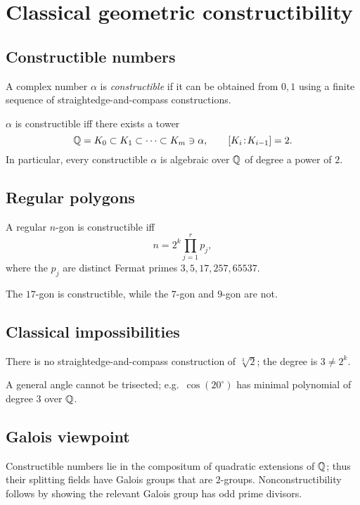 \section{Classical geometric constructibility}\label{sec:constructibility}

\subsection{Constructible numbers}
\begin{definition}
A complex number $\alpha$ is \emph{constructible} if it can be obtained from $0,1$ using a finite sequence of straightedge-and-compass constructions.
\end{definition}
\begin{theorem}
$\alpha$ is constructible iff there exists a tower
\[
\mathbb{Q}=K_0\subset K_1\subset\cdots\subset K_m\ni \alpha,\qquad
[K_i\!:\!K_{i-1}]=2.
\]
In particular, every constructible $\alpha$ is algebraic over $\mathbb{Q}$ of degree a power of $2$.
\end{theorem}

\subsection{Regular polygons}
\begin{theorem}
A regular $n$-gon is constructible iff
\[
n=2^{k} \prod_{j=1}^r p_j,
\]
where the $p_j$ are distinct Fermat primes $3,5,17,257,65537$.
\end{theorem}
\begin{example}
The $17$-gon is constructible, while the $7$-gon and $9$-gon are not.
\end{example}

\subsection{Classical impossibilities}
\begin{corollary}
There is no straightedge-and-compass construction of $\sqrt[3]{2}$; the degree is $3\not=2^k$.
\end{corollary}
\begin{corollary}
A general angle cannot be trisected; e.g.\ $\cos(20^\circ)$ has minimal polynomial of degree $3$ over $\mathbb{Q}$.
\end{corollary}

\subsection{Galois viewpoint}
\begin{remark}
Constructible numbers lie in the compositum of quadratic extensions of $\mathbb{Q}$; thus their splitting fields have Galois groups that are $2$-groups. Nonconstructibility follows by showing the relevant Galois group has odd prime divisors.
\end{remark}

